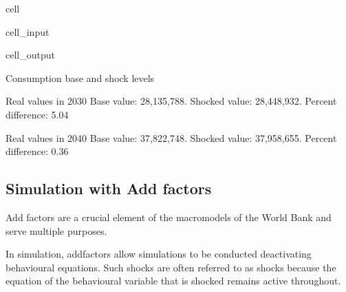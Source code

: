 \documentclass[letterpaper,10pt,english]{jupyterBook}
\begin{document}
\begin{sphinxuseclass}{cell}
\begin{sphinxVerbatimInput}
\begin{sphinxuseclass}{cell_input}
\begin{sphinxVerbatim}[commandchars=\\\{\}]
    \PYG{p}{[}\PYG{p}{]}\PYG{p}{[}\PYG{p}{]}\PYG{p}{[}\PYG{p}{]}
\end{sphinxVerbatim}

\end{sphinxuseclass}\end{sphinxVerbatimInput}
\begin{sphinxVerbatimOutput}

\begin{sphinxuseclass}{cell_output}
\begin{sphinxVerbatim}[commandchars=\\\{\}]
Consumption base and shock levels

Real values in 2030
Base value:  28,135,788.	Shocked value: 28,448,932.
Percent difference: 5.04

Real values in 2040
Base value:  37,822,748.	Shocked value: 37,958,655.
Percent difference: 0.36
\end{sphinxVerbatim}

\end{sphinxuseclass}\end{sphinxVerbatimOutput}

\end{sphinxuseclass}

\subsection{Simulation with Add factors}
\label{\detokenize{content/06_WBModels/ScenarioAnalysis:simulation-with-add-factors}}
\sphinxAtStartPar
Add factors are a crucial element of the macromodels of the World Bank and serve multiple purposes.

\sphinxAtStartPar
In simulation, add\sphinxhyphen{}factors allow simulations to be conducted  de\sphinxhyphen{}activating behavioural equations.  Such shocks are often referred to as  shocks because the equation of the behavioural variable that is shocked remains  active throughout.
\end{document}
